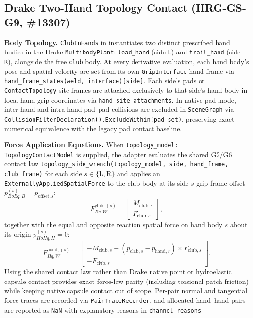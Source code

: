 \documentclass[11pt,a4paper]{article}
\begin{document}
\subsection{Drake Two-Hand Topology Contact (HRG-GS-G9, \#13307)}
\textbf{Body Topology.} \texttt{ClubInHands} in  instantiates two distinct
prescribed hand bodies in the Drake \texttt{MultibodyPlant}: \texttt{lead\_hand} (side \texttt{L}) and \texttt{trail\_hand} (side \texttt{R}),
alongside the free \texttt{club} body. At every derivative evaluation, each hand body's pose and spatial velocity are set from its own
\texttt{GripInterface} hand frame via \texttt{hand\_frame\_states(weld, interface)[side]}. Each side's pads or \texttt{ContactTopology} site frames
are attached exclusively to that side's hand body in local hand-grip coordinates via \texttt{hand\_site\_attachments}. In native pad mode,
inter-hand and intra-hand pad--pad collisions are excluded in \texttt{SceneGraph} via \texttt{CollisionFilterDeclaration().ExcludeWithin(pad\_set)},
preserving exact numerical equivalence with the legacy pad contact baseline.

\textbf{Force Application Equations.} When \texttt{topology\_model: TopologyContactModel} is supplied, the adapter evaluates the shared G2/G6
contact law \texttt{topology\_side\_wrench(topology\_model, side, hand\_frame, club\_frame)} for each side $s \in \{\mathrm{L}, \mathrm{R}\}$
and applies an \texttt{ExternallyAppliedSpatialForce} to the club body at its side-$s$ grip-frame offset $p_{BoBq,B}^{(s)} = p_{\mathrm{offset},s}$:
\begin{equation}
F_{Bq,W}^{\mathrm{club},(s)} = \begin{bmatrix} M_{\mathrm{club},s} \\ F_{\mathrm{club},s} \end{bmatrix},
\end{equation}
together with the equal and opposite reaction spatial force on hand body $s$ about its origin $p_{HoHq,H}^{(s)} = 0$:
\begin{equation}
F_{Hq,W}^{\mathrm{hand},(s)} = \begin{bmatrix} -M_{\mathrm{club},s} - (p_{\mathrm{club},s} - p_{\mathrm{hand},s}) \times F_{\mathrm{club},s} \\ -F_{\mathrm{club},s} \end{bmatrix}.
\end{equation}
Using the shared contact law rather than Drake native point or hydroelastic capsule contact provides exact force-law parity (including torsional
patch friction) while keeping native capsule contact out of scope. Per-pair normal and tangential force traces are recorded via
\texttt{PairTraceRecorder}, and allocated hand--hand pairs are reported as \texttt{NaN} with explanatory reasons in \texttt{channel\_reasons}.
\end{document}
